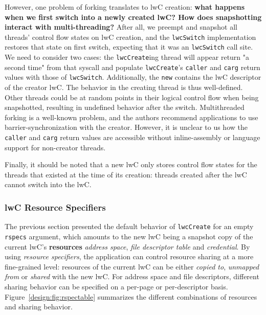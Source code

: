 \documentclass[10pt,twocolumn,letter]{article}
\begin{document}
However, one problem of forking translates to lwC creation:
\textbf{what happens when we first switch into a newly created lwC? How does snapshotting interact with multi-threading?}
After all, we preempt and snapshot all threads' control flow states on lwC creation, and the \lstinline{lwcSwitch} implementation restores that state on first switch, expecting that it was an \lstinline{lwcSwitch} call site.
We need to consider two cases:
the \lstinline{lwcCreate}ing thread will appear return "a second time" from that syscall and populate \lstinline{lwcCreate}'s \lstinline{caller} and \lstinline{carg} return values with those of \lstinline{lwcSwitch}.
Additionally, the \lstinline{new} contains the lwC descriptor of the creator lwC.
The behavior in the creating thread is thus well-defined.
Other threads could be at random points in their logical control flow when being snapshotted, resulting in undefined behavior after the switch.
Multithreaded forking is a well-known problem,  and the authors recommend applications to use barrier-synchronization with the creator.
However, it is unclear to us how the \lstinline{caller} and \lstinline{carg} return values are accessible without inline-assembly or language support for non-creator threads.

Finally, it should be noted that a new lwC only stores control flow states for the threads that existed at the time of its creation:
threads created after the lwC cannot switch into the lwC.

\subsubsection{lwC Resource Specifiers}\label{design:rspecs}
The previous section presented the default behavior of \lstinline{lwcCreate} for an empty \lstinline{rspecs} argument, which amounts to the new lwC being a snapshot copy of the current lwC's \textbf{resources} \textit{address space}, \textit{file descriptor table} and \textit{credential}.
By using \textit{resource specifiers}, the application can control resource sharing at a more fine-grained level:
resources of the current lwC can be either \textit{copied to}, \textit{unmapped from} or \textit{shared} with the new lwC.
For address space and file descriptors, different sharing behavior can be specified on a per-page or per-descriptor basis.
Figure~\ref{design:fig:rspectable} summarizes the different combinations of resources and sharing behavior.
\end{document}
